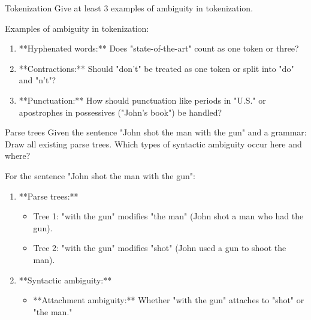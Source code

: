 \documentclass{article}
\begin{document}
\begin{exercise}{Tokenization}
  Give at least 3 examples of ambiguity in tokenization.

  \begin{solution}
    Examples of ambiguity in tokenization:
    \begin{enumerate}
        \item **Hyphenated words:** Does "state-of-the-art" count as one token or three?
        \item **Contractions:** Should "don't" be treated as one token or split into "do" and "n't"?
        \item **Punctuation:** How should punctuation like periods in "U.S." or apostrophes in possessives ("John's book") be handled?
    \end{enumerate}
  \end{solution}
\end{exercise}

\begin{exercise}{Parse trees}
  Given the sentence "John shot the man with the gun" and a grammar: Draw all existing parse trees. Which types of syntactic ambiguity occur here and where?

  \begin{solution}
    For the sentence "John shot the man with the gun":
    \begin{enumerate}
        \item **Parse trees:**
            \begin{itemize}
                \item Tree 1: "with the gun" modifies "the man" (John shot a man who had the gun).
                \item Tree 2: "with the gun" modifies "shot" (John used a gun to shoot the man).
            \end{itemize}
        \item **Syntactic ambiguity:** 
        \begin{itemize}
            \item **Attachment ambiguity:** Whether "with the gun" attaches to "shot" or "the man."
        \end{itemize}
    \end{enumerate}
  \end{solution}
\end{exercise}
\end{document}
